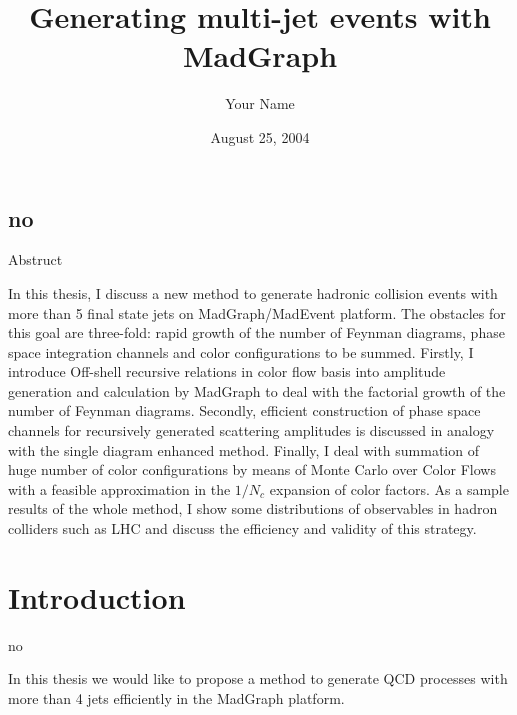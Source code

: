 \documentclass{book}
\title{Generating multi-jet events with MadGraph}
\author{Your Name}
\date{August 25, 2004}
\begin{document}
\maketitle
\tableofcontents

\section{no}
Abstruct

In this thesis, I discuss a new method to generate hadronic collision events with more than 5 final state jets on MadGraph/MadEvent  platform. The obstacles for this goal are three-fold: rapid growth of the number of Feynman diagrams,  phase space integration channels and color configurations to be summed. Firstly, I introduce Off-shell recursive relations in color flow basis into amplitude generation and calculation by MadGraph to deal with the factorial growth of the number of Feynman diagrams. Secondly,  efficient construction of phase space channels for recursively generated scattering amplitudes is discussed in analogy with the single diagram enhanced method. Finally, I deal with summation of huge number of color configurations by means of Monte Carlo over Color Flows with a feasible approximation in the $1/N_c$ expansion of color factors. As a sample results of the whole method, I show some distributions of observables in hadron colliders  such as LHC and discuss the efficiency and validity of this strategy.

\chapter{Introduction}
no

In this thesis we would like to propose a method to generate QCD processes with more than 4 jets efficiently in the MadGraph platform.
\end{document}
